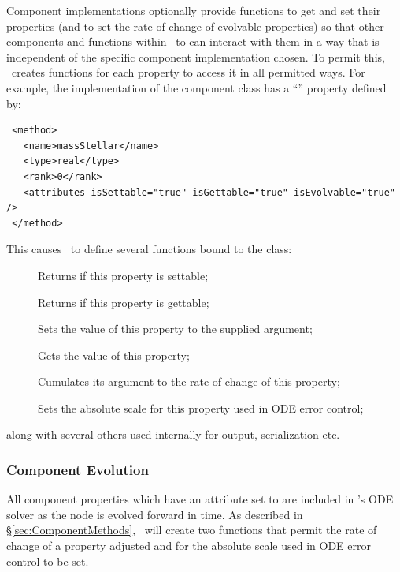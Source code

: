 Component implementations optionally provide functions to get and set their properties (and to set the rate of change of evolvable properties) so that other components and functions within \glc\ to can interact with them in a way that is independent of the specific component implementation chosen. To permit this, \glc\ creates functions for each property to access it in all permitted ways. For example, the  implementation of the  component class has a ``'' property defined by:
\begin{verbatim}
 <method>
   <name>massStellar</name>
   <type>real</type>
   <rank>0</rank>
   <attributes isSettable="true" isGettable="true" isEvolvable="true" />
 </method>
\end{verbatim}
This causes \glc\ to define several functions bound to the  class:
\begin{description}
\item [] Returns  if this property is settable;
\item [] Returns  if this property is gettable;
\item [] Sets the value of this property to the supplied argument;
\item [] Gets the value of this property;
\item [] Cumulates its argument to the rate of change of this property;
\item [] Sets the absolute scale for this property used in ODE error control;
\end{description}
along with several others used internally for output, serialization etc.

\subsubsection{Component Evolution}\label{sec:ComponentEvolution}

All component properties which have an  attribute set to  are included in \glc's ODE solver as the node is evolved forward in time. As described in \S\ref{sec:ComponentMethods}, \glc\ will create two functions that permit the rate of change of a property adjusted and for the absolute scale used in ODE error control to be set.



